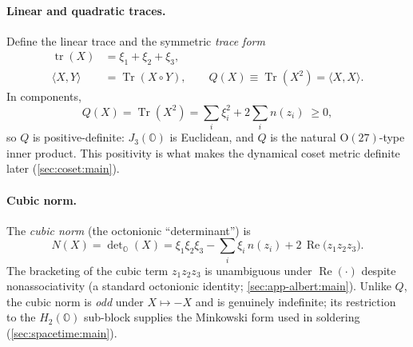 \paragraph{Linear and quadratic traces.}
Define the linear trace and the symmetric \emph{trace form}
\begin{align}
  \operatorname{tr}(X) &= \xi_{1}+\xi_{2}+\xi_{3},
  \label{eq:albert:lintrace}\\[2pt]
  \langle X,Y\rangle &= \operatorname{Tr}(X\circ Y),
  \qquad
  Q(X)\equiv \operatorname{Tr}(X^{2})=\langle X,X\rangle .
  \label{eq:albert:traceform}
\end{align}
In components,
\begin{equation}\label{eq:albert:Qcomp}
  Q(X)=\operatorname{Tr}(X^{2})
  =\sum_{i}\xi_{i}^{2}+2\sum_{i} n(z_{i}) \;\ge 0 ,
\end{equation}
so $Q$ is positive-definite: $J_{3}(\mathbb{O})$ is Euclidean, and $Q$ is
the natural $\mathrm{O}(27)$-type inner product. This positivity is what
makes the dynamical coset metric definite later
(\autoref{sec:coset:main}).

\paragraph{Cubic norm.}
The \emph{cubic norm} (the octonionic ``determinant'') is
\begin{equation}\label{eq:albert:Ndef}
  N(X)=\det\nolimits_{\mathbb{O}}(X)
  =\xi_{1}\xi_{2}\xi_{3}
   -\sum_{i}\xi_{i}\,n(z_{i})
   +2\,\operatorname{Re}\!\bigl(z_{1}z_{2}z_{3}\bigr).
\end{equation}
The bracketing of the cubic term $z_{1}z_{2}z_{3}$ is unambiguous under
$\operatorname{Re}(\cdot)$ despite nonassociativity (a standard
octonionic identity; \autoref{sec:app-albert:main}). Unlike $Q$, the cubic
norm is \emph{odd} under $X\mapsto -X$ and is genuinely indefinite; its
restriction to the $H_{2}(\mathbb{O})$ sub-block supplies the Minkowski
form used in soldering (\autoref{sec:spacetime:main}).

